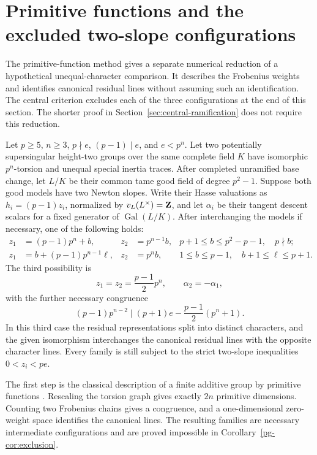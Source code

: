 \section{Primitive functions and the excluded two-slope configurations}\label{sec:primitive-grading}
The primitive-function method gives a separate numerical reduction of a hypothetical unequal-character comparison. It describes the Frobenius weights and identifies canonical residual lines without assuming such an identification. The central criterion excludes each of the three configurations at the end of this section. The shorter proof in Section~\ref{sec:central-ramification} does not require this reduction.

\begin{theorem}\label{thm:three-family-reduction}
Let $p\ge5$, $n\ge3$, $p\nmid e$, $(p-1)\mid e$, and $e<p^n$. Let two potentially supersingular height-two groups over the same complete field $K$ have isomorphic $p^n$-torsion and unequal special inertia traces. After completed unramified base change, let $L/K$ be their common tame good field of degree $p^2-1$. Suppose both good models have two Newton slopes. Write their Hasse valuations as $h_i=(p-1)z_i$, normalized by $v_L(L^\times)=\mathbf Z$, and let $\alpha_i$ be their tangent descent scalars for a fixed generator of $\operatorname{Gal}(L/K)$. After interchanging the models if necessary, one of the following holds:
\begin{align}
 z_1&=(p-1)p^n+b,&z_2&=p^{n-1}b,
 &p+1\le b\le p^2-p-1,\quad p\nmid b;
 \label{eq:pg-family-one}\\
 z_1&=b+(p-1)p^{n-1}\ell,&z_2&=p^nb,
 &1\le b\le p-1,\quad b+1\le\ell\le p+1.
 \label{eq:pg-family-two}
\end{align}
The third possibility is
\begin{equation}\label{eq:pg-family-sign}
 z_1=z_2=\frac{p-1}{2}p^n,\qquad \alpha_2=-\alpha_1,
\end{equation}
with the further necessary congruence
\begin{equation}\label{eq:pg-family-congruence}
 (p-1)p^{n-2}\mid(p+1)e-\frac{p-1}{2}(p^n+1).
\end{equation}
In this third case the residual representations split into distinct characters, and the given isomorphism interchanges the canonical residual lines with the opposite character lines. Every family is still subject to the strict two-slope inequalities $0<z_i<pe$.
\end{theorem}

The first step is the classical description of a finite additive group by primitive functions \citep[\S\S2.1--2.2]{Koch2015}. Rescaling the torsion graph gives exactly $2n$ primitive dimensions. Counting two Frobenius chains gives a congruence, and a one-dimensional zero-weight space identifies the canonical lines. The resulting families are necessary intermediate configurations and are proved impossible in Corollary~\ref{pg-cor:exclusion}.

